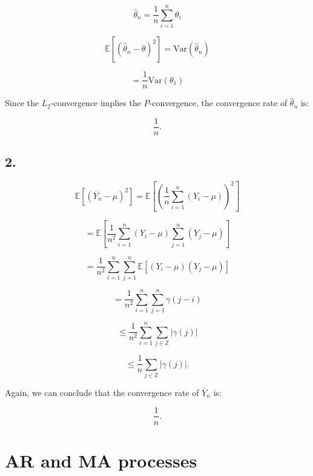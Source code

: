 \documentclass[11pt]{article}
\begin{document}
\begin{solution}  %

\[
\widehat{\theta}_n = \frac{1}{n} \sum_{i=1}^n \theta_i
\]

\[
\mathbb{E} \left[ \left( \widehat{\theta}_n - \theta \right)^2 \right] = \text{Var}(\widehat{\theta}_n)
\]

\[
= \frac{1}{n} \text{Var}(\theta_1)
\]

Since the \(L_2\)-convergence implies the \(P\)-convergence, the convergence rate of \(\widehat{\theta}_n\) is:

\[
\frac{1}{n}.
\]

\subsection*{2.}

\[
\mathbb{E} \left[ \left( \overline{Y}_n - \mu \right)^2 \right] = \mathbb{E} \left[ \left( \frac{1}{n} \sum_{i=1}^n (Y_i - \mu) \right)^2 \right]
\]

\[
= \mathbb{E} \left[ \frac{1}{n^2} \sum_{i=1}^n (Y_i - \mu) \sum_{j=1}^n (Y_j - \mu) \right]
\]

\[
= \frac{1}{n^2} \sum_{i=1}^n \sum_{j=1}^n \mathbb{E} \left[ (Y_i - \mu)(Y_j - \mu) \right]
\]

\[
= \frac{1}{n^2} \sum_{i=1}^n \sum_{j=1}^n \gamma(j - i)
\]

\[
\leq \frac{1}{n^2} \sum_{i=1}^n \sum_{j \in \mathbb{Z}} |\gamma(j)|
\]

\[
\leq \frac{1}{n} \sum_{j \in \mathbb{Z}} |\gamma(j)|.
\]

Again, we can conclude that the convergence rate of \(\overline{Y}_n\) is:

\[
\frac{1}{n}.
\]



\end{solution}


\newpage
\section{AR and MA processes}
\end{document}
